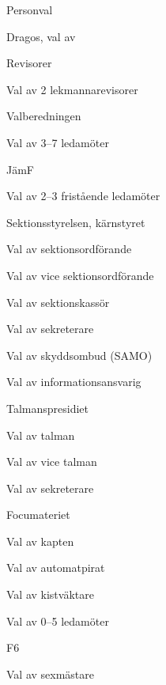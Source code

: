 \documentclass[slutlig]{sektionsmote}
\begin{document}
\begin{ootd}
\item{Personval}
\begin{ootd}
    \item Dragos, val av
    \item Revisorer
    \begin{ootd}
        \item Val av 2 lekmannarevisorer
    \end{ootd}
    \item Valberedningen
    \begin{ootd}
        \item Val av 3--7 ledamöter
    \end{ootd}
    \item JämF
    \begin{ootd}
        \item Val av 2--3 fristående ledamöter
    \end{ootd}
    \item Sektionsstyrelsen, kärnstyret
    \begin{ootd}
        \item Val av sektionsordförande
        \item Val av vice sektionsordförande
        \item Val av sektionskassör
        \item Val av sekreterare
        \item Val av skyddsombud (SAMO)
        \item Val av informationsansvarig
    \end{ootd}
    \item Talmanspresidiet
    \begin{ootd}
        \item Val av talman
        \item Val av vice talman
        \item Val av sekreterare
    \end{ootd}
    \item Focumateriet
    \begin{ootd}
        \item Val av kapten
        \item Val av automatpirat
        \item Val av kistväktare
        \item Val av 0--5 ledamöter
    \end{ootd}
    \item F6
    \begin{ootd}
        \item Val av sexmästare

\end{ootd}
\end{ootd}
\end{ootd}
\end{document}
